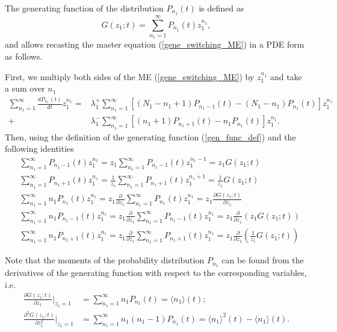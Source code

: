 \documentclass[a4paper, 11pt]{article}
\begin{document}
The generating function of the distribution $P_{n_1}(t)$ is defined as
\begin{equation} \label{gen_func_def} 
  G(z_1; t) = \sum_{n_1=1}^{\infty}P_{n_1}(t)z_1^{n_1},
\end{equation}
and allows recasting the master equation (\ref{gene_switching_ME}) in a PDE form as follows.

First, we multiply both sides of the ME (\ref{gene_switching_ME}) by $z_1^{n_1}$ and take a sum over $n_1$
\begin{equation}
  \begin{split}
    \sum_{n_1=1}^{\infty}\frac{dP_{n_1}(t)}{dt}z_1^{n_1} = &\lambda_1^+\sum_{n_1=1}^{\infty}\left[(N_1-n_1+1)P_{n_1-1}(t) - (N_1-n_1)P_{n_1}(t)\right]z_1^{n_1}\\
    + & \lambda_1^-\sum_{n_1=1}^{\infty}\left[(n_1+1)P_{n_1+1}(t) - n_1P_{n_1}(t)\right]z_1^{n_1}.
  \end{split}
\end{equation}
Then, using the definition of the generating function (\ref{gen_func_def}) and the following identities
\begin{align*}
  & \sum_{n_1=1}^{\infty}P_{n_1-1}(t)z_1^{n_1} = z_1\sum_{n_1=1}^{\infty}P_{n_1-1}(t)z_1^{n_1-1} = z_1G(z_1;t)\\
  & \sum_{n_1=1}^{\infty}P_{n_1+1}(t)z_1^{n_1} = \frac{1}{z_1}\sum_{n_1=1}^{\infty}P_{n_1+1}(t)z_1^{n_1+1} = \frac{1}{z_1}G(z_1;t)\\
  & \sum_{n_1=1}^{\infty}n_1P_{n_1}(t)z_1^{n_1} = z_1\frac{\partial}{\partial z_1}\sum_{n_1=1}^{\infty}P_{n_1}(t)z_1^{n_1} = z_1\frac{\partial G(z_1; t)}{\partial z_1}\\
  & \sum_{n_1=1}^{\infty}n_1P_{n_1-1}(t)z_1^{n_1} = z_1\frac{\partial}{\partial z_1}\sum_{n_1=1}^{\infty}P_{n_1-1}(t)z_1^{n_1} = z_1\frac{\partial}{\partial z_1} \left(z_1G(z_1; t)\right)\\
  & \sum_{n_1=1}^{\infty}n_1P_{n_1+1}(t)z_1^{n_1} = z_1\frac{\partial}{\partial z_1}\sum_{n_1=1}^{\infty}P_{n_1+1}(t)z_1^{n_1} = z_1\frac{\partial}{\partial z_1} \left(\frac{1}{z_1}G(z_1; t)\right)
\end{align*}

Note that the moments of the probability distribution $P_{n_1}$ can be found from the derivatives of the generating function with respect to the corresponding variables, i.e.
\begin{align}
  \frac{\partial G(z_1; t)}{\partial z_1}\bigg\rvert_{z_1=1} &= \sum_{n_1=1}^{\infty} n_1P_{n_1}(t) = \langle n_1\rangle(t);\\
  \frac{\partial^2 G(z_1; t)}{\partial z_1^2}\bigg\rvert_{z_1=1} &= \sum_{n_1=1}^{\infty} n_1(n_1-1)P_{n_1}(t) = \langle n_1\rangle^2(t) - \langle n_1\rangle(t).
\end{align}
\end{document}

